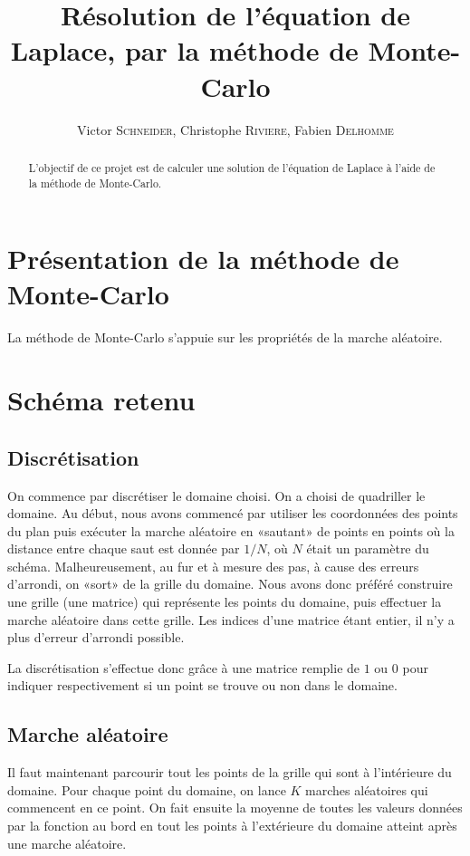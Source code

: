 \documentclass[11pt, a4paper]{article}
\title{Résolution de l'équation de Laplace, par la méthode de Monte-Carlo}
\author{Victor \textsc{Schneider}, Christophe \textsc{Riviere}, Fabien \textsc{Delhomme}}
\begin{document}
\maketitle
\begin{abstract}
	L'objectif de ce projet est de calculer une solution de l'équation de Laplace à l'aide de la méthode de Monte-Carlo.
\end{abstract}


\section{Présentation de la méthode de Monte-Carlo}

La méthode de Monte-Carlo s'appuie sur les propriétés de la marche aléatoire.

\section{Schéma retenu}

\subsection{Discrétisation}
On commence par discrétiser le domaine choisi. On a choisi de quadriller le domaine.  Au début, nous
avons commencé par utiliser les coordonnées des points du plan puis exécuter la marche aléatoire en
«sautant» de points en points où la distance entre chaque saut est donnée par $1/N$, où $N$ était un
paramètre du schéma.  Malheureusement, au fur et à mesure des pas, à cause des erreurs d'arrondi, on
«sort» de la grille du domaine. Nous avons donc préféré construire une grille (une matrice)
qui représente les points du domaine, puis effectuer la marche aléatoire dans cette grille. Les
indices d'une matrice étant entier, il n'y a plus d'erreur d'arrondi possible.

La discrétisation s'effectue donc grâce à une matrice remplie de $1$ ou $0$ pour indiquer
respectivement si un point se trouve ou non dans le domaine.

\subsection{Marche aléatoire}

Il faut maintenant parcourir tout les points de la grille qui sont à l'intérieure du domaine.
Pour chaque point du domaine, on lance $K$  marches aléatoires qui commencent en ce point. On fait
ensuite la moyenne de toutes les valeurs données par la fonction au bord en tout les points à
l'extérieure du domaine atteint après une marche aléatoire.
\end{document}
